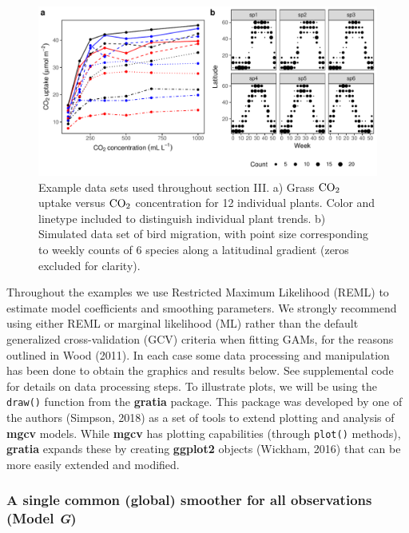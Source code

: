\documentclass[12pt]{article}
\begin{document}
\begin{figure}
\includegraphics[width=\linewidth]{../figures/vis_data-1} \caption{\label{fig:vis_data}Example data sets used throughout section III. a) Grass $\text{CO}\textsubscript{2}$ uptake versus $\text{CO}\textsubscript{2}$ concentration for 12 individual plants. Color and linetype included to distinguish individual plant trends. b) Simulated data set of bird migration, with point size corresponding to weekly counts of 6 species along a latitudinal gradient (zeros excluded for clarity). }\label{fig:vis_data}
\end{figure}

Throughout the examples we use Restricted Maximum Likelihood (REML) to
estimate model coefficients and smoothing parameters. We strongly
recommend using either REML or marginal likelihood (ML) rather than the
default generalized cross-validation (GCV) criteria when fitting GAMs,
for the reasons outlined in Wood (2011). In each case some data
processing and manipulation has been done to obtain the graphics and
results below. See supplemental code for details on data processing
steps. To illustrate plots, we will be using the \texttt{draw()}
function from the \textbf{gratia} package. This package was developed by
one of the authors (Simpson, 2018) as a set of tools to extend plotting
and analysis of \textbf{mgcv} models. While \textbf{mgcv} has plotting
capabilities (through \texttt{plot()} methods), \textbf{gratia} expands
these by creating \textbf{ggplot2} objects (Wickham, 2016) that can be
more easily extended and modified.

\subsubsection{\texorpdfstring{A single common (global) smoother for all
observations (Model
\emph{G})}{A single common (global) smoother for all observations (Model G)}}\label{a-single-common-global-smoother-for-all-observations-model-g}
\end{document}
